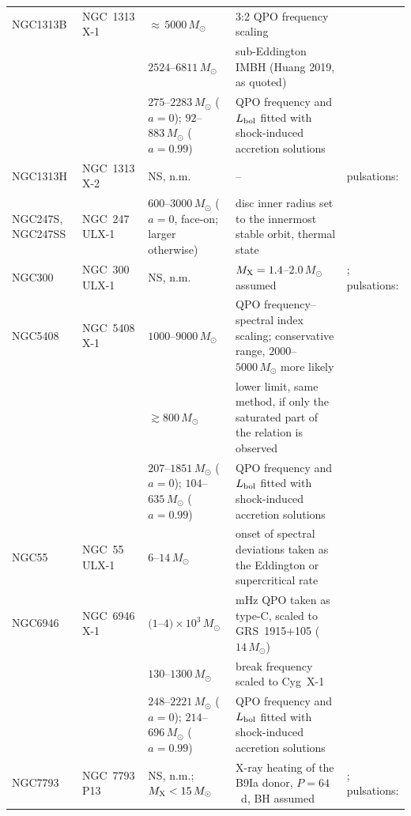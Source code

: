 \begin{table}
\begin{tabular}{@{}lp{}p{}p{}p{}@{}}
NGC1313B & NGC~1313 X-1\idq{} & ${\approx}\,5000\,M_\odot$ & 3:2 QPO frequency scaling & \citealt{Pasham2015} \\
 & & $2524$--$6811\,M_\odot$ & sub-Eddington IMBH (Huang 2019, as quoted) & \citealt{Majumder2023} \\
 & & $275$--$2283\,M_\odot$ ($a=0$); $92$--$883\,M_\odot$ ($a=0.99$) & QPO frequency and $L_{\rm bol}$ fitted with shock-induced accretion solutions & \citealt{Majumder2023} \\
NGC1313H & NGC~1313 X-2\idq{} & NS, n.m. & -- & pulsations: \citealt{Sathyaprakash2019} \\
NGC247S, NGC247SS & NGC~247 ULX-1 & $600$--$3000\,M_\odot$ ($a=0$, face-on; larger otherwise) & disc inner radius set to the innermost stable orbit, thermal state & \citealt{Jin2011} \\
NGC300 & NGC~300 ULX-1 & NS, n.m. & $M_{\rm X} = 1.4$--$2.0\,M_\odot$ assumed & \citealt{Heida2019}; pulsations: \citealt{Carpano2018} \\
NGC5408 & NGC~5408 X-1 & $1000$--$9000\,M_\odot$ & QPO frequency--spectral index scaling; conservative range, $2000$--$5000\,M_\odot$ more likely & \citealt{StrohmayerMushotzky2009} \\
 & & $\gtrsim 800\,M_\odot$ & lower limit, same method, if only the saturated part of the relation is observed & \citealt{Pasham2012} \\
 & & $207$--$1851\,M_\odot$ ($a=0$); $104$--$635\,M_\odot$ ($a=0.99$) & QPO frequency and $L_{\rm bol}$ fitted with shock-induced accretion solutions & \citealt{Majumder2023} \\
NGC55 & NGC~55 ULX-1 & $6$--$14\,M_\odot$ & onset of spectral deviations taken as the Eddington or supercritical rate & \citealt{Barra2022} \\
NGC6946 & NGC~6946 X-1 & $(1$--$4)\times10^{3}\,M_\odot$ & mHz QPO taken as type-C, scaled to GRS~1915+105 ($14\,M_\odot$) & \citealt{Rao2010} \\
 & & $130$--$1300\,M_\odot$ & break frequency scaled to Cyg~X-1 & \citealt{Rao2010} \\
 & & $248$--$2221\,M_\odot$ ($a=0$); $214$--$696\,M_\odot$ ($a=0.99$) & QPO frequency and $L_{\rm bol}$ fitted with shock-induced accretion solutions & \citealt{Majumder2023} \\
NGC7793 & NGC~7793 P13 & NS, n.m.; $M_{\rm X} < 15\,M_\odot$ & X-ray heating of the B9Ia donor, $P = 64$~d, BH assumed & \citealt{Motch2014}; pulsations: \citealt{Furst2016, Israel2017} \\

\end{tabular}
\end{table}
